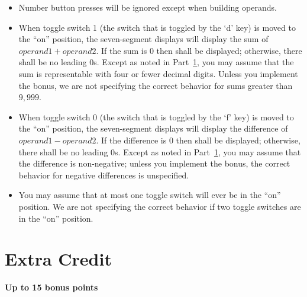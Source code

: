 \begin{itemize}
\begin{itemize}
\begin{tabular}{r}
            {\dviiseg 53} \\
            {\dviiseg 530} \\
            {\dviiseg 5309}
            \end{tabular}
        \item There is no way to build a negative operand.
        \item Except as noted in Section~\ref{bonus}, you may assume that
            operands are representable with four or fewer decimal digits.
            Unless you implement the bonus, we are not specifying the
            correct behavior if the user presses a fifth number button.
    \end{itemize}
    \item Number button presses will be ignored except when building
        operands.
    \item When toggle switch 1 (the switch that is toggled by the `d' key)
        is moved to the ``on'' position, the seven-segment displays will
        display the sum of $operand1 + operand2$. If the sum is $0$ then
        {} shall be displayed; otherwise, there shall be no
        leading $0$s. Except as noted in Part~\ref{bonus}, you may assume
        that the sum is representable with four or fewer decimal digits.
        Unless you implement the bonus, we are not specifying the correct
        behavior for sums greater than $9,999$.
    \item When toggle switch 0 (the switch that is toggled by the `f' key)
        is moved to the ``on'' position, the seven-segment displays will
        display the difference of $operand1 - operand2$. If the difference
        is $0$ then {} shall be displayed; otherwise, there shall
        be no leading $0$s. Except as noted in Part~\ref{bonus}, you may
        assume that the difference is non-negative; unless you implement
        the bonus, the correct behavior for negative differences is
        unspecified.
    \item You may assume that at most one toggle switch will ever be in the
        ``on'' position. We are not specifying the correct behavior if two
        toggle switches are in the ``on'' position.
\end{itemize}


\section{Extra Credit} \label{bonus}

\textbf{Up to 15 bonus points}

